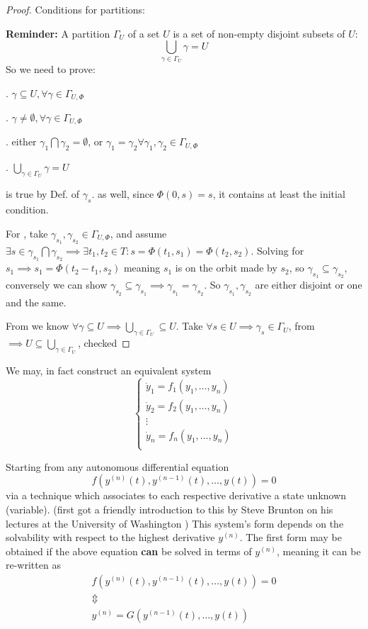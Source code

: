 \begin{proof}
	Conditions for partitions:
	\par \textbf{Reminder:} A partition $\Gamma_U$ of a set $U$ is a set of non-empty disjoint subsets of $U$:
	\[
		\bigcup_{\gamma\in \Gamma_U} \gamma = U
	\]
	So we need to prove:

	. $\gamma \subseteq U, \forall \gamma \in \Gamma_{U,\Phi}$ \par
	. $ \gamma \neq \emptyset, \forall \gamma \in \Gamma_{U,\Phi}$ \par
	. either $\gamma_1 \bigcap \gamma_2 = \emptyset$, or $ \gamma_1 = \gamma_2 \forall \gamma_1, \gamma_2 \in \Gamma_{U,\Phi}$ \par
	. $\bigcup_{\gamma\in \Gamma_U} \gamma = U$ \par

	 is true by Def. of $\gamma_s$.  as well, since $\Phi(0,s) = s$, it contains at least the initial condition.

	For , take $\gamma_{s_1}, \gamma_{s_2} \in \Gamma_{U, \Phi}$, and assume $\exists s \in \gamma_{s_1} \bigcap \gamma_{s_2} \implies \exists t_1,t_2 \in T : s = \Phi(t_1,s_1) = \Phi(t_2, s_2)$. Solving for $s_1 \implies s_1 = \Phi(t_2-t_1, s_2)$ meaning $s_1$ is on the orbit made by $s_2$, so $\gamma_{s_1} \subseteq \gamma_{s_2}$, conversely we can show $\gamma_{s_2} \subseteq \gamma_{s_1} \implies \gamma_{s_1} = \gamma_{s_2}$. So $\gamma_{s_1}, \gamma_{s_2}$ are either disjoint or one and the same.

	From  we know $\forall \gamma \subseteq U \implies \bigcup_{\gamma\in \Gamma_U} \subseteq U$. Take $\forall s \in U \implies \gamma_s \in \Gamma_U$, from  $\implies U \subseteq \bigcup_{\gamma\in \Gamma_U}$,  checked
\end{proof}

We may, in fact construct an equivalent system
\[
	\begin{cases}
		\dot{y}_1 = f_1(y_1,\dots, y_n) \\
		\dot{y}_2 = f_2(y_1,\dots, y_n) \\
		\vdots                          \\
		\dot{y}_n = f_n(y_1,\dots, y_n) \\
	\end{cases}
\]

Starting from any autonomous differential equation
\[
	f(y^{(n)}(t), y^{(n-1)}(t), \dots, y(t))= 0
\]
via a technique which associates to each respective derivative a state unknown (variable). (first got a friendly introduction to this by Steve Brunton on his lectures at the University of Washington \cite{eigensteve})
This system's form depends on the solvability with respect to the highest derivative $y^{(n)}$.
The first form may be obtained if the above equation \textbf{can} be solved in terms of $y^{(n)}$, meaning it can be re-written as
\begin{gather*}
	f(y^{(n)}(t), y^{(n-1)}(t), \dots, y(t))= 0 \\
	\Updownarrow \\
	y^{(n)}  = G(y^{(n-1)}(t), \dots, y(t))
\end{gather*}

